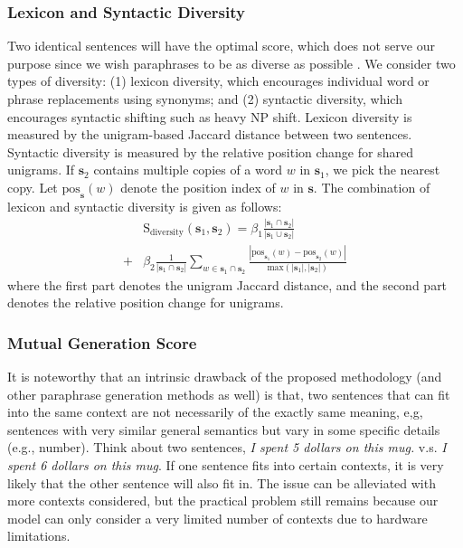 \documentclass[11pt,a4paper]{article}
\begin{document}
\subsubsection{Lexicon and Syntactic Diversity }
Two identical sentences will have the optimal score, which does not serve our purpose since we wish paraphrases to be as diverse as possible \cite{li-etal-2018-paraphrase}.  
We consider two types of diversity:
(1) lexicon diversity, which encourages individual word or phrase replacements using synonyms; and 
(2) syntactic diversity, which encourages syntactic shifting such as heavy NP shift. 
Lexicon diversity
is measured by the unigram-based Jaccard distance between two sentences. 
Syntactic diversity is measured by  the relative position change for shared unigrams. If $\bm{s}_2$  contains multiple copies of a word $w$ in $\bm{s}_1$, we pick the nearest copy.  Let $\text{pos}_{\bm{s}}(w)$ denote the position index of $w$ in $\bm{s}$. 
The combination of
lexicon and syntactic diversity  is given as follows:
\begin{equation}
\begin{aligned}
&\text{S}_{\text{diversity}}(\bm{s}_1, \bm{s}_2) = \beta_1\frac{|\bm{s}_1\cap \bm{s}_2|}{|\bm{s}_1\cup \bm{s}_2|}  \\+
&\beta_2\frac{1}{|\bm{s}_1\cap \bm{s}_2|}\sum_{w\in \bm{s}_1\cap \bm{s}_2} \frac{|\text{pos}_{\bm{s}_1}(w)-\text{pos}_{\bm{s}_2}(w)|}{\text{max}(|\bm{s}_1|,|\bm{s}_2|)}
\end{aligned}
\end{equation}
where the first part denotes the unigram Jaccard distance, and the second part denotes the relative position change for unigrams. 

\subsubsection{Mutual Generation Score}
It is noteworthy that an intrinsic drawback of the proposed methodology (and other paraphrase generation methods as well) is that, 
two sentences that can fit into the same context are not necessarily of the exactly same meaning, e,g,  
sentences with very similar general semantics but vary in some specific details (e.g., number).
Think about two sentences,  {\it I spent 5 dollars on this mug.} v.s.  
{\it I spent 6 dollars on this mug}. 
If one sentence fits  into certain contexts, it is very likely that the other sentence  will also fit in. 
The issue can be alleviated with more contexts considered, but the practical problem still remains because our model can only consider a very limited number of contexts due to 
hardware limitations.
\end{document}

